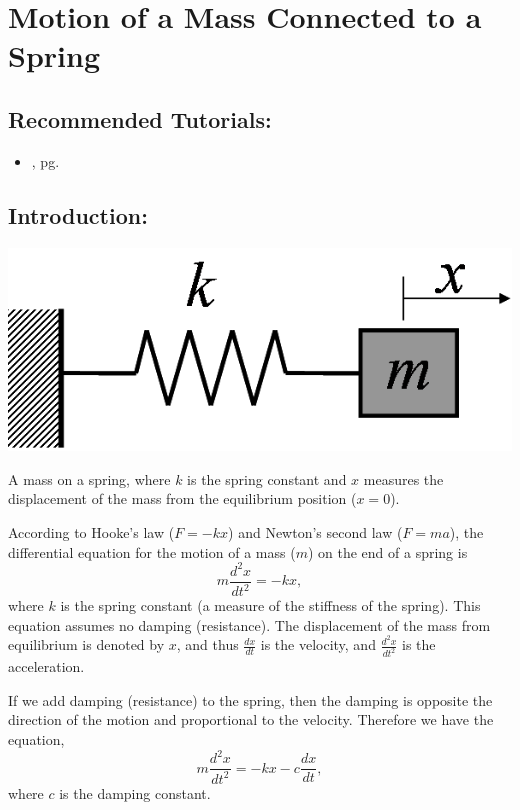 \section{Motion of a Mass Connected to a Spring}
\label{sec:motion_of_a_mass_connected_to_a_spring}	

\subsection*{Recommended Tutorials:}
\begin{itemize}[noitemsep]
	\item {}, pg. \pageref{chp:differential_equations}
\end{itemize}

\subsection*{Introduction:}
\begin{marginfigure}
    \includegraphics[scale=0.5]{activities/math122/figures/mass_spring.png}
    \caption{A mass on a spring, where $k$ is the spring constant and $x$ measures the displacement of the mass from the equilibrium position ($x=0$).}
    \label{fig:mass_spring}
\end{marginfigure}
According to Hooke's law ($F=-kx$) and Newton's second law ($F=ma$), the differential equation for the motion of a mass ($m$) on the end of a spring is 
\begin{equation*}
m \frac{d^2x}{dt^2}=-kx,
\end{equation*}
where $k$ is the spring constant (a measure of the stiffness of the spring). This equation assumes no damping (resistance). The displacement of the mass from equilibrium is denoted by $x$, and thus $\frac{dx}{dt}$ is the velocity, and $\frac{d^2x}{dt^2}$ is the acceleration. 

If we add damping (resistance) to the spring, then the damping is opposite the direction of the motion and proportional to the velocity. Therefore we have the equation,
\[ m \frac{d^2x}{dt^2}=-kx-c\frac{dx}{dt}, \]
where $c$ is the damping constant. 


